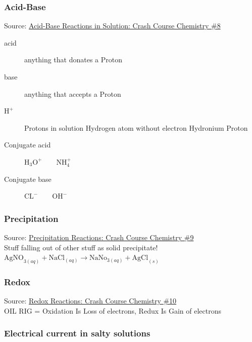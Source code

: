 \subsubsection{Acid-Base}
Source: \href{https://www.youtube.com/watch?v=ANi709MYnWg&list=PL8dPuuaLjXtPHzzYuWy6fYEaX9mQQ8oGr&index=9}{Acid-Base Reactions in Solution: Crash Course Chemistry \#8}

\begin{description}
    \item[acid] anything that donates a Proton
    \item[base] anything that accepts a Proton 
    \item[$\text{H}^+$] Protons in solution \arrow Hydrogen atom without electron \arrow Hydronium \arrow Proton
    \item[Conjugate acid] $\text{H}_3\text{O}^+ \qquad \text{N}\text{H}_4^+$ 
    \item[Conjugate base] $\text{C}\text{L}^- \qquad \text{O}\text{H}^-$ 
\end{description}

\subsubsection{Precipitation}
Source: \href{https://www.youtube.com/watch?v=IIu16dy3ThI&list=PL8dPuuaLjXtPHzzYuWy6fYEaX9mQQ8oGr&index=10}{Precipitation Reactions: Crash Course Chemistry \#9}
\\
Stuff falling out of other stuff as solid precipitate!\\
$\text{AgNO}_{3(aq)}+\text{NaCl}_{(aq)} \to \text{NaNo}_{3(aq)} + \text{AgCl}_{(s)}$
\subsubsection{Redox}
Source: \href{https://www.youtube.com/watch?v=lQ6FBA1HM3s&list=PL8dPuuaLjXtPHzzYuWy6fYEaX9mQQ8oGr&index=11}{Redox Reactions: Crash Course Chemistry \#10}
\\
OIL RIG = Oxidation Is Loss of electrons, Redux Is Gain of electrons

\subsubsection{Electrical current in salty solutions}

